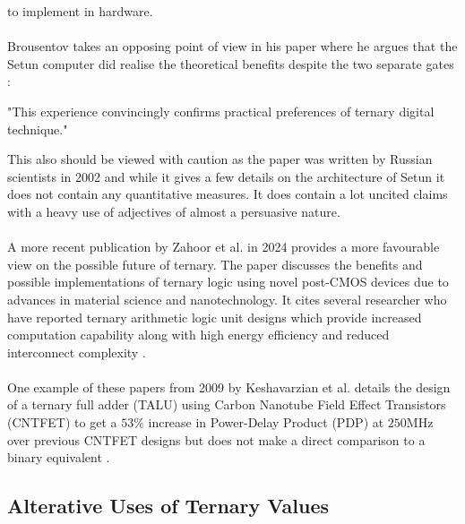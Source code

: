 \documentclass[12pt]{article}
\begin{document}
to implement in hardware.\\
\\
Brousentov takes an opposing point of view in his paper where he argues that the Setun computer did realise the theoretical 
benefits despite the two separate gates \citep{brousentsov2002development}:\\
\begin{displayquote}
    "This experience convincingly confirms practical preferences of ternary digital technique."
\end{displayquote}
This also should be viewed with caution as the paper was written by Russian scientists in 2002 and while it gives a few details on the 
architecture of Setun it does not contain any quantitative measures. It does contain a lot uncited claims with a heavy use of adjectives of 
almost a persuasive nature.\\
\\
A more recent publication by Zahoor et al. in 2024 provides a more favourable view on the possible future of ternary. 
The paper discusses the benefits and possible implementations of ternary logic using novel post-CMOS devices due to advances in 
material science and nanotechnology. It cites several researcher who have reported ternary arithmetic logic unit designs which 
provide increased computation capability along with high energy efficiency and reduced interconnect complexity \citep{zahoor2024design}.\\
\\
One example of these papers from 2009 by Keshavarzian et al. details the design of a ternary full adder (TALU) 
using Carbon Nanotube Field Effect Transistors (CNTFET) to get a $53\%$ increase in Power-Delay Product (PDP) 
at $250$MHz over previous CNTFET designs but does not make a direct comparison to a binary equivalent \citep{keshavarzian2014novel}.

\subsection{Alterative Uses of Ternary Values}
\end{document}
